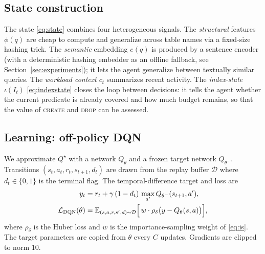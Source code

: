 \subsection{State construction}
The state \eqref{eq:state} combines four heterogeneous signals. The
\emph{structural} features \(\phi(q)\) are cheap to compute and generalize across
table names via a fixed-size hashing trick. The \emph{semantic} embedding
\(e(q)\) is produced by a sentence encoder (with a deterministic hashing
embedder as an offline fallback, see Section~\ref{sec:experiments}); it lets the
agent generalize between textually similar queries. The \emph{workload context}
\(c_t\) summarizes recent activity. The \emph{index-state} \(\iota(I_t)\)
\eqref{eq:indexstate} closes the loop between decisions: it tells the agent
whether the current predicate is already covered and how much budget remains, so
that the value of \textsc{create} and \textsc{drop} can be assessed.

\subsection{Learning: off-policy DQN}
We approximate \(Q^\star\) with a network \(Q_\theta\) and a frozen target
network \(Q_{\theta^-}\). Transitions \((s_t,a_t,r_t,s_{t+1},d_t)\) are drawn
from the replay buffer \(\mathcal{D}\) where \(d_t\in\{0,1\}\) is the terminal
flag. The temporal-difference target and loss are
\begin{align}
  y_t &= r_t + \gamma\,(1-d_t)\,\max_{a'} Q_{\theta^-}(s_{t+1},a'), \label{eq:target}\\
  \mathcal{L}_{\mathrm{DQN}}(\theta) &= \mathbb{E}_{(s,a,r,s',d)\sim\mathcal{D}}
     \Big[\, w \cdot \rho_\delta\big(y - Q_\theta(s,a)\big) \Big], \label{eq:dqnloss}
\end{align}
where \(\rho_\delta\) is the Huber loss and \(w\) is the importance-sampling
weight of \eqref{eq:is}. The target parameters are copied from \(\theta\)
every \(C\) updates. Gradients are clipped to norm \(10\).

